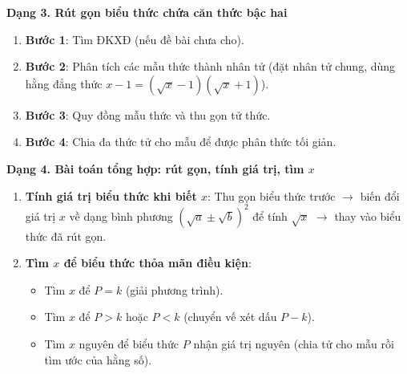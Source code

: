 \textbf{Dạng 3. Rút gọn biểu thức chứa căn thức bậc hai}
\begin{enumerate}
\item \textbf{Bước 1}: Tìm ĐKXĐ (nếu đề bài chưa cho).
\item \textbf{Bước 2}: Phân tích các mẫu thức thành nhân tử (đặt nhân tử chung, dùng hằng đẳng thức $x - 1 = (\sqrt{x}-1)(\sqrt{x}+1)$).
\item \textbf{Bước 3}: Quy đồng mẫu thức và thu gọn tử thức.
\item \textbf{Bước 4}: Chia đa thức tử cho mẫu để được phân thức tối giản.
\end{enumerate}

\textbf{Dạng 4. Bài toán tổng hợp: rút gọn, tính giá trị, tìm $x$}
\begin{enumerate}
\item \textbf{Tính giá trị biểu thức khi biết $x$}: Thu gọn biểu thức trước $\rightarrow$ biến đổi giá trị $x$ về dạng bình phương $(\sqrt{a} \pm \sqrt{b})^2$ để tính $\sqrt{x}$ $\rightarrow$ thay vào biểu thức đã rút gọn.
\item \textbf{Tìm $x$ để biểu thức thỏa mãn điều kiện}:
\begin{itemize}
\item Tìm $x$ để $P = k$ (giải phương trình).
\item Tìm $x$ để $P > k$ hoặc $P < k$ (chuyển vế xét dấu $P - k$).
\item Tìm $x$ nguyên để biểu thức $P$ nhận giá trị nguyên (chia tử cho mẫu rồi tìm ước của hằng số).
\end{itemize}
\end{enumerate}
